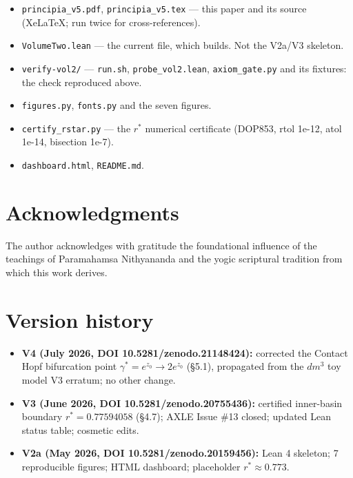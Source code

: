 \documentclass[11pt]{article}
\theoremstyle{boxed}
\begin{document}
\begin{itemize}[nosep]
  \item \texttt{principia\_v5.pdf}, \texttt{principia\_v5.tex} --- this paper and its source
        (XeLaTeX; run twice for cross-references).
  \item \texttt{VolumeTwo.lean} --- the current file, which builds. Not the V2a/V3 skeleton.
  \item \texttt{verify-vol2/} --- \texttt{run.sh}, \texttt{probe\_vol2.lean},
        \texttt{axiom\_gate.py} and its fixtures: the check reproduced above.
  \item \texttt{figures.py}, \texttt{fonts.py} and the seven figures.
  \item \texttt{certify\_rstar.py} --- the $r^{*}$ numerical certificate (DOP853, rtol 1e-12,
        atol 1e-14, bisection 1e-7).
  \item \texttt{dashboard.html}, \texttt{README.md}.
\end{itemize}

\section*{Acknowledgments}

The author acknowledges with gratitude the foundational influence of the teachings
of Paramahamsa Nithyananda and the yogic scriptural tradition from which this work derives.

\section*{Version history}

\begin{itemize}[leftmargin=2em]
  \item \textbf{V4 (July 2026, DOI 10.5281/zenodo.21148424):} corrected the Contact Hopf bifurcation point $\gamma^{*}=e^{z_0}\to2e^{z_0}$ (\S 5.1), propagated from the $dm^3$ toy model V3 erratum; no other change.
  \item \textbf{V3 (June 2026, DOI 10.5281/zenodo.20755436):} certified inner-basin boundary $r^{*} = 0.77594058$ (\S 4.7); AXLE Issue \#13 closed; updated Lean status table; cosmetic edits.
  \item \textbf{V2a (May 2026, DOI 10.5281/zenodo.20159456):} Lean 4 skeleton; 7 reproducible figures; HTML dashboard; placeholder $r^{*} \approx 0.773$.
\end{itemize}
\end{document}
